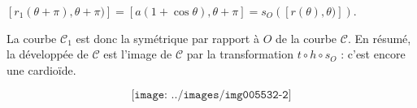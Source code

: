 {\begin{enumerate}
{\begin{center}
$[r_1(\theta+\pi),\theta+\pi)]=[a(1+\cos\theta),\theta+\pi]=s_O([r(\theta),\theta)])$.
\end{center}
La courbe $\mathcal{C}_1$ est donc la symétrique par rapport à $O$ de la courbe $\mathcal{C}$. En résumé, la développée de $\mathcal{C}$ est l'image de $\mathcal{C}$ par la transformation $t\circ h\circ s_O$ : c'est encore une cardioïde.

$$\texttt{[image: ../images/img005532-2]}$$}
\end{enumerate}
}
